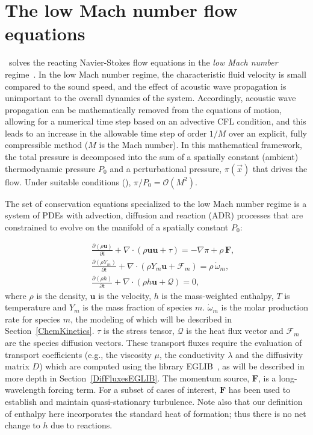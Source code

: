 \section{The low Mach number flow equations}
\newcommand{\etal}{{\it et al.}}

\pelelm\ solves the reacting Navier-Stokes flow equations in the \emph{low Mach number} regime~\cite{DayBell:2000,rehm1978equations,Majda:1985}. In the low Mach number regime, the characteristic fluid velocity is small compared to the sound speed, and the effect of acoustic wave propagation is unimportant to the overall dynamics of the system. Accordingly, acoustic wave propagation can be mathematically removed from the equations of motion, allowing for a numerical time step based on an advective CFL condition, and this leads to an increase in the allowable time step of order $1/M$ over an explicit, fully compressible method ($M$ is the Mach number).  In this mathematical framework, the total pressure is decomposed into the sum of a spatially constant (ambient) thermodynamic pressure $P_0$ and a perturbational pressure, $\pi({\vec x})$ that drives the flow.  Under suitable conditions (\cite{Majda:1985}), $\pi/P_0 = \mathcal{O} (M^2)$. 

The set of conservation equations specialized to the low Mach number regime is a system of PDEs with advection, diffusion and reaction (ADR) processes that are constrained to evolve on the manifold of a spatially constant $P_0$:

\begin{eqnarray}
&&\frac{\partial (\rho \boldsymbol{u})}{\partial t} + 
\nabla \cdot \left(\rho  \boldsymbol{u} \boldsymbol{u} + \tau \right)
= -\nabla \pi + \rho \, \boldsymbol{F}  ,
\nonumber
\\
&&\frac{\partial (\rho Y_m)}{\partial t} +
\nabla \cdot \left( \rho Y_m \boldsymbol{u} + \boldsymbol{\mathcal{F}}_{m} \right)
= \rho \, \dot{\omega}_m,
\label{eq:gen}
\\
&&\frac{ \partial (\rho h)}{ \partial t} +
\nabla \cdot \left( \rho h \boldsymbol{u} + \boldsymbol{\mathcal{Q}} \right) = 0 ,
\nonumber
\end{eqnarray}
where $\rho$ is the density, $\boldsymbol{u}$ is the velocity, $h$ is the mass-weighted enthalpy, $T$ is temperature and $Y_m$ is the mass fraction of species $m$. $\dot{\omega}_m$ is the molar production rate for species $m$, the modeling of which will be described in Section~\ref{ChemKinetics}. $\tau$ is the stress tensor, $\boldsymbol{\mathcal{Q}}$ is the heat flux vector and $\boldsymbol{\mathcal{F}}_m$
are the species diffusion vectors. These transport fluxes require the evaluation of transport coefficients (e.g., the viscosity $\mu$, the conductivity $\lambda$ and the diffusivity matrix $D$) which are computed using the library EGLIB~\cite{EGLIB}, as will be described in more depth in Section~\ref{DifFluxesEGLIB}. The momentum source, $\boldsymbol{F}$, is a long-wavelength forcing term.  For a subset of cases of interest, $\boldsymbol{F}$ has been used to establish and maintain quasi-stationary turbulence. Note also that our definition of enthalpy here incorporates the standard heat of formation; thus there is no net change to $h$ due to reactions.

